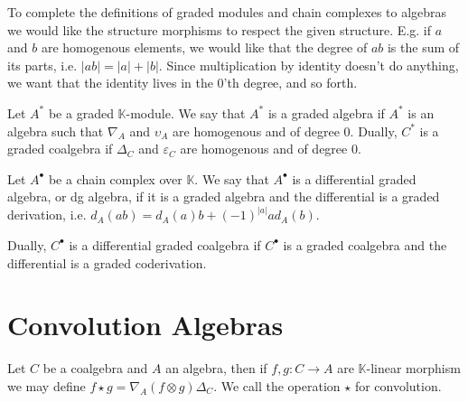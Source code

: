 \documentclass[../thesis.tex]{subfiles}
\begin{document}
            To complete the definitions of graded modules and chain complexes to algebras we would like the structure morphisms to respect the given structure. E.g. if $a$ and $b$ are homogenous elements, we would like that the degree of $ab$ is the sum of its parts, i.e. $|ab| = |a| + |b|$. Since multiplication by identity doesn't do anything, we want that the identity lives in the $0$'th degree, and so forth.

            \begin{definition}
                Let $A^*$ be a graded $\mathbb{K}$-module. We say that $A^*$ is a graded algebra if $A^*$ is an algebra such that $\nabla_A$ and $\upsilon_A$ are homogenous and of degree $0$.
                Dually, $C^*$ is a graded coalgebra if $\Delta_C$ and $\varepsilon_C$ are homogenous and of degree $0$.
            \end{definition}

            \begin{definition}
                Let $A^{\bullet}$ be a chain complex over $\mathbb{K}$. We say that $A^{\bullet}$ is a differential graded algebra, or dg algebra, if it is a graded algebra and the differential is a graded derivation, i.e. $d_A(ab) = d_A(a)b + (-1)^{|a|}ad_A(b)$.

                Dually, $C^{\bullet}$ is a differential graded coalgebra if $C^{\bullet}$ is a graded coalgebra and the differential is a graded coderivation.
            \end{definition}

    \section{Convolution Algebras}

            Let $C$ be a coalgebra and $A$ an algebra, then if $f,g:C\rightarrow A$ are $\mathbb{K}$-linear morphism we may define $f\star g = \nabla_A(f\otimes g)\Delta_C$. We call the operation $\star$ for convolution.

            \begin{center}
            \end{center}
\end{document}
